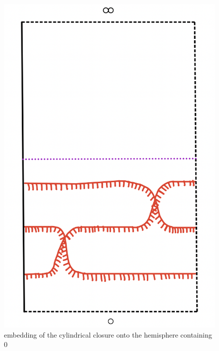 \begin{figure}[H] %
    \centering
    \includegraphics[scale = 0.95]{diagrams/natural_alternating_diagrams/4-2.png} %
    \caption{embedding of the cylindrical closure onto the hemisphere containing $0$}
    \label{fig:your-label}
\end{figure}



